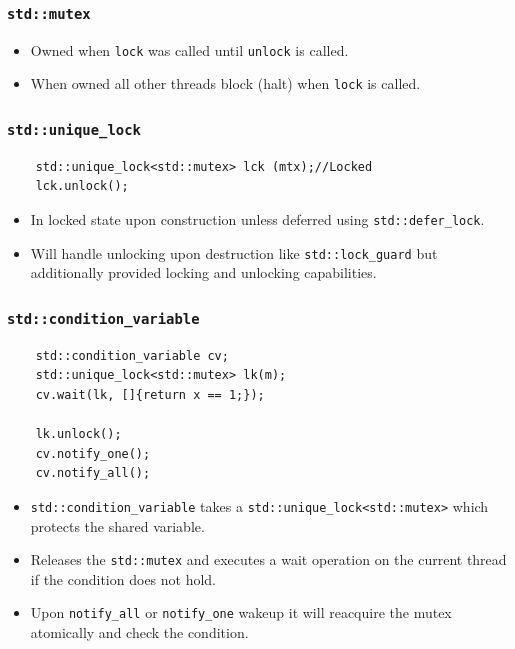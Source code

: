 \documentclass[9pt,landscape,a4paper, table]{extarticle}
\begin{document}
\begin{multicols*}{3}
\subsubsection{\texttt{std::mutex}}
\begin{itemize}
    \item Owned when \texttt{lock} was called until \texttt{unlock} is called. 
    \item When owned all other threads block (halt) when \texttt{lock} is called. 
\end{itemize}

\subsubsection{\texttt{std::unique\_lock}}

\begin{verbatim}
    std::unique_lock<std::mutex> lck (mtx);//Locked
    lck.unlock();
\end{verbatim}

\begin{itemize}
    \item In locked state upon construction unless deferred using \texttt{std::defer\_lock}.
    \item Will handle unlocking upon destruction like \texttt{std::lock\_guard} but additionally provided locking and unlocking capabilities. 
\end{itemize}

\subsubsection{\texttt{std::condition\_variable}}

\begin{verbatim}
    std::condition_variable cv;
    std::unique_lock<std::mutex> lk(m);
    cv.wait(lk, []{return x == 1;});
    
    lk.unlock();
    cv.notify_one();
    cv.notify_all();
\end{verbatim}


\begin{itemize}
    \item \texttt{std::condition\_variable} takes a \texttt{std::unique\_lock<std::mutex>} which protects the shared variable.
    \item Releases the \texttt{std::mutex} and executes a wait operation on the current thread if the condition does not hold. 
    \item Upon \texttt{notify\_all} or \texttt{notify\_one} wakeup it will reacquire the mutex atomically and check the condition. 
\end{itemize}


\end{multicols*}
\end{document}
